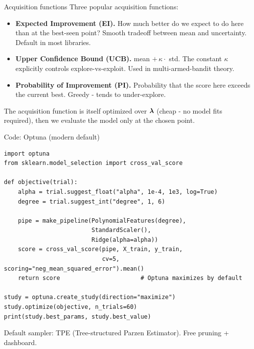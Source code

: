 \documentclass[aspectratio=169]{beamer}
\begin{document}
\begin{frame}{Acquisition functions}
  Three popular acquisition functions:
  \vfill
  \begin{itemize}
    \item \textbf{Expected Improvement (EI).} How much better do we expect to do here than at the best-seen point? Smooth tradeoff between mean and uncertainty. Default in most libraries.
    \item \textbf{Upper Confidence Bound (UCB).} mean $+\, \kappa \cdot$ std. The constant $\kappa$ explicitly controls explore-vs-exploit. Used in multi-armed-bandit theory.
    \item \textbf{Probability of Improvement (PI).} Probability that the score here exceeds the current best. Greedy - tends to under-explore.
  \end{itemize}
  \vfill
  The acquisition function is itself optimized over $\bm{\lambda}$ (cheap - no model fits required), then we evaluate the model only at the chosen point.
  \vfill
\end{frame}

\begin{frame}[fragile]{Code: Optuna (modern default)}
\begin{lstlisting}
import optuna
from sklearn.model_selection import cross_val_score

def objective(trial):
    alpha = trial.suggest_float("alpha", 1e-4, 1e3, log=True)
    degree = trial.suggest_int("degree", 1, 6)

    pipe = make_pipeline(PolynomialFeatures(degree),
                         StandardScaler(),
                         Ridge(alpha=alpha))
    score = cross_val_score(pipe, X_train, y_train,
                            cv=5, scoring="neg_mean_squared_error").mean()
    return score                       # Optuna maximizes by default

study = optuna.create_study(direction="maximize")
study.optimize(objective, n_trials=60)
print(study.best_params, study.best_value)
\end{lstlisting}
  \vfill
  \footnotesize Default sampler: TPE (Tree-structured Parzen Estimator). Free pruning + dashboard.
\end{frame}
\end{document}
